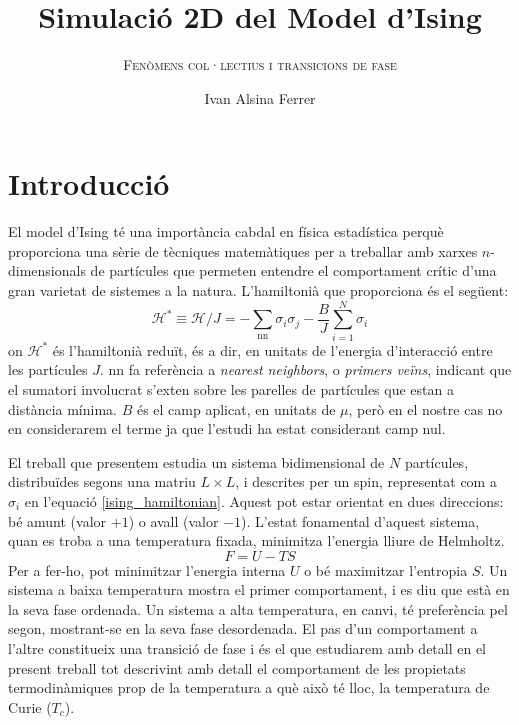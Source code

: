 \documentclass[a4paper]{article}
\title{\textbf{Simulació 2D del Model d'Ising}}
\subtitle{\scshape{Fenòmens col·lectius i transicions de fase}}
\author{Ivan Alsina Ferrer}
\date{}
\begin{document}
\maketitle

\section{Introducció}

El model d'Ising té una importància cabdal en física estadística perquè proporciona una sèrie de tècniques matemàtiques per a treballar amb xarxes $n$-dimensionals de partícules que permeten entendre el comportament crític d'una gran varietat de sistemes a la natura. L'hamiltonià que proporciona és el següent:
\begin{equation*} \label{ising_hamiltonian}
    \mathcal{H}^* \equiv \mathcal{H}/J = -\sum_\text{nn} \sigma_i \sigma_j - \frac{B}{J} \sum_{i=1}^{N} \sigma_i
\end{equation*}
on $\mathcal{H}^*$ és l'hamiltonià reduït, és a dir, en unitats de l'energia d'interacció entre les partícules $J$. nn fa referència a \textit{nearest neighbors}, o \textit{primers veïns}, indicant que el sumatori involucrat s'exten sobre les parelles de partícules que estan a distància mínima. $B$ és el camp aplicat, en unitats de $\mu$, però en el nostre cas no en considerarem el terme ja que l'estudi ha estat considerant camp nul.

El treball que presentem estudia un sistema bidimensional de $N$ partícules, distribuïdes segons una matriu $L\times L$, i descrites per un spin, representat com a $\sigma_i$ en l'equació \eqref{ising_hamiltonian}. Aquest pot estar orientat en dues direccions: bé amunt (valor $+1$) o avall (valor $-1$). L'estat fonamental d'aquest sistema, quan es troba a una temperatura fixada, minimitza l'energia lliure de Helmholtz.
\begin{equation*}
    F = U - TS
\end{equation*}
Per a fer-ho, pot minimitzar l'energia interna $U$ o bé maximitzar l'entropia $S$. Un sistema a baixa temperatura mostra el primer comportament, i es diu que està en la seva fase ordenada. Un sistema a alta temperatura, en canvi, té preferència pel segon, mostrant-se en la seva fase desordenada. El pas d'un comportament a l'altre constitueix una transició de fase i és el que estudiarem amb detall en el present treball tot descrivint amb detall el comportament de les propietats termodinàmiques prop de la temperatura a què això té lloc, la temperatura de Curie ($T_c$).
\end{document}
